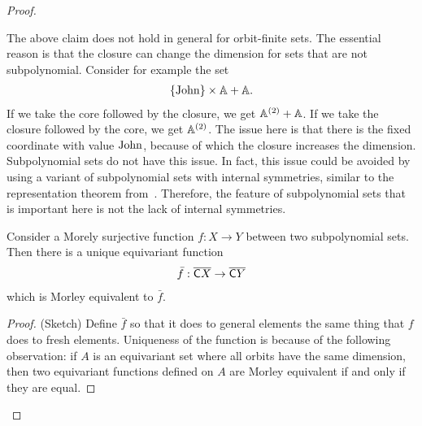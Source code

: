 \begin{proof}
    \begin{myexample}
            The above claim does not hold in general for orbit-finite sets.  The essential reason is that the closure can change the dimension for sets that are not subpolynomial. Consider for example the set 
            \begin{align*}
            \{\mathrm{John}\} \times \mathbb A + \mathbb A.
            \end{align*}
            If we take the core followed by the closure, we get $\mathbb A^{(2)} + \mathbb A$. If we take the closure followed by the core, we get $\mathbb A^{(2)}$.  The issue here is that there is the fixed coordinate with value $\mathrm{John}$, because of which the closure increases the dimension.  Subpolynomial sets do not have this issue. In fact,  this issue could be avoided by using a variant of subpolynomial sets with internal symmetries, similar to the representation theorem from~\cite[Theorem 4.18]{bojanczyk_slightly2018}. Therefore, the feature of subpolynomial sets that is important here is not the lack of internal symmetries. 
    \end{myexample}

    \begin{claim}\label{claim:equivariant-version}
        Consider a Morely surjective function $f : X \to Y$ between two subpolynomial sets. Then there is a unique equivariant function
        \begin{align*}
        \bar f : \overline{ \mathsf C X} \to \overline{ \mathsf C Y}
        \end{align*}
         which is  Morley equivalent to $\bar f$.
    \end{claim}
    \begin{proof}(Sketch)
        Define $\bar f$ so that it does to general elements the same thing that $f$ does to fresh elements.  Uniqueness of the function is because of the following observation: if $A$ is an equivariant set where all orbits have the same dimension, then two equivariant functions defined on $A$ are Morley equivalent if and only if they are equal.
    \end{proof}


\end{proof}
